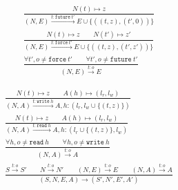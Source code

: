 \documentclass{article}
\newcommand{\TName}{t}
\newcommand{\TNamey}{t'}
\newcommand{\HName}{h}
\newcommand{\State}{S}
\newcommand{\reduces}[1][]{\xrightarrow{{#1}}}
\newcommand{\Op}{o}
\newcommand{\Nat}{z}
\newcommand{\Naty}{z'}
\newcommand{\Edges}{E}
\newcommand{\Nodes}{l}
\newcommand{\AccessMap}{A}
\newcommand{\Time}{N}
\newcommand{\OP}[2][\TName]{{#1}:{#2}}
\newcommand{\WRITE}[1]{\mathtt{write}\ {#1}}
\newcommand{\READ}[1]{\mathtt{read}\ {#1}}
\newcommand{\FUTURE}[1]{\mathtt{future}\ {#1}}
\newcommand{\FORCE}[1]{\mathtt{force}\ {#1}}
\begin{document}
\begin{gather*}  
\frac{
  \Time(\TName) \mapsto \Nat
}{
  (\Time, \Edges) \reduces[{\OP{\FUTURE \TNamey}}] \Edges \cup \{((\TName,\Nat),(\TNamey,0))\}
}
\\
\frac{
  \Time(\TName) \mapsto \Nat
  \qquad
  \Time(\TNamey) \mapsto \Naty
}{
  (\Time, \Edges) \reduces[{\OP{\FORCE \TNamey}}] \Edges \cup \{((\TName,\Nat),(\TNamey,\Naty))\}
}
\\
\frac{
  \forall \TNamey, \Op \neq \FORCE \TNamey
  \qquad
  \forall \TNamey, \Op \neq \FUTURE \TNamey
}{
  (\Time, \Edges) \reduces[{\OP{\Op}}] \Edges
}
\end{gather*}

\begin{gather*}
\frac{
  \Time(\TName) \mapsto \Nat
  \qquad
  \AccessMap(\HName) \mapsto (\Nodes_r,\Nodes_w)
}{
  (\Time, \AccessMap) \reduces[{\OP{\WRITE \HName}}] \AccessMap, \HName \colon (\Nodes_r,\Nodes_w \cup \{(\TName,\Nat)\})
}
\\
\frac{
  \Time(\TName) \mapsto \Nat
  \qquad
  \AccessMap(\HName) \mapsto (\Nodes_r,\Nodes_w)
}{
  (\Time, \AccessMap) \reduces[{\OP{\READ \HName}}] \AccessMap, \HName \colon (\Nodes_r\cup \{(\TName,\Nat)\},\Nodes_w )
}
\\
\frac{
  \forall \HName, \Op \neq \READ \HName
  \qquad
  \forall \HName, \Op \neq \WRITE \HName
}{
  (\Time, \AccessMap) \reduces[{\OP{\Op}}] \AccessMap
}
\\
\frac{
  \State \reduces[{\OP{\Op}}] \State'
  \qquad
  \Time \reduces[{\OP{\Op}}] \Time'
  \qquad
  (\Time, \Edges) \reduces[{\OP{\Op}}] \Edges
  \qquad
  (\Time, \AccessMap) \reduces[{\OP{\Op}}] \AccessMap
}{
  (\State,\Time,\Edges,\AccessMap)
  \reduces
  (\State',\Time',\Edges',\AccessMap')
}
\end{gather*}
\end{document}
